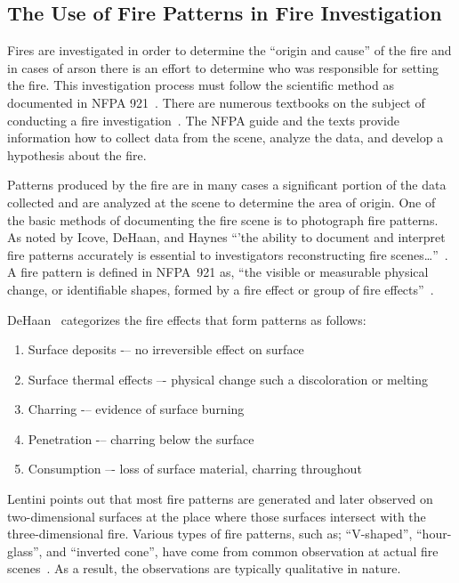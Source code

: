 \documentclass[twoside]{uocthesis}
\begin{document}
\subsection{The Use of Fire Patterns in Fire Investigation}
Fires are investigated in order to determine the ``origin and cause'' of the fire and in cases of arson there is an effort to determine who was responsible for setting the fire.  This investigation process must follow the scientific method as documented in NFPA 921~\cite{NFPA:921}.  There are numerous textbooks on the subject of conducting a fire investigation~\cite{Almirall:2004,Fire_Investigation,DeHaan:2012,Icove:2013,Lentini:2006,Noon:1995}. The NFPA guide and the texts provide information how to collect data from the scene, analyze the data, and develop a hypothesis about the fire.

Patterns produced by the fire are in many cases a significant portion of the data collected and are analyzed at the scene to determine the area of origin.  One of the basic methods of documenting the fire scene is to photograph fire patterns.  As noted by Icove, DeHaan, and Haynes  ``'the ability to document and interpret fire patterns accurately is essential to investigators reconstructing fire scenes…''~\cite{Icove:2013}.  A fire pattern is defined in NFPA~921 as, ``the visible or measurable physical change, or identifiable shapes, formed by a fire effect or group of fire effects''~\cite{NFPA:921}.

DeHaan~\cite{DeHaan:2012} categorizes the fire effects that form patterns as follows:
\begin{enumerate}
\item Surface deposits -– no irreversible effect on surface
\item Surface thermal effects –- physical change such a discoloration or melting
\item Charring -– evidence of surface burning
\item Penetration -– charring below the surface
\item Consumption –- loss of surface material, charring throughout
\end{enumerate}
Lentini points out that most fire patterns are generated and later observed on two-dimensional surfaces at the place where those surfaces intersect with the three-dimensional fire. Various types of fire patterns, such as; ``V-shaped'', ``hour-glass'', and ``inverted cone'', have come from common observation at actual fire scenes~\cite{Lentini:2006}.  As a result, the observations are typically qualitative in nature.
\end{document}

